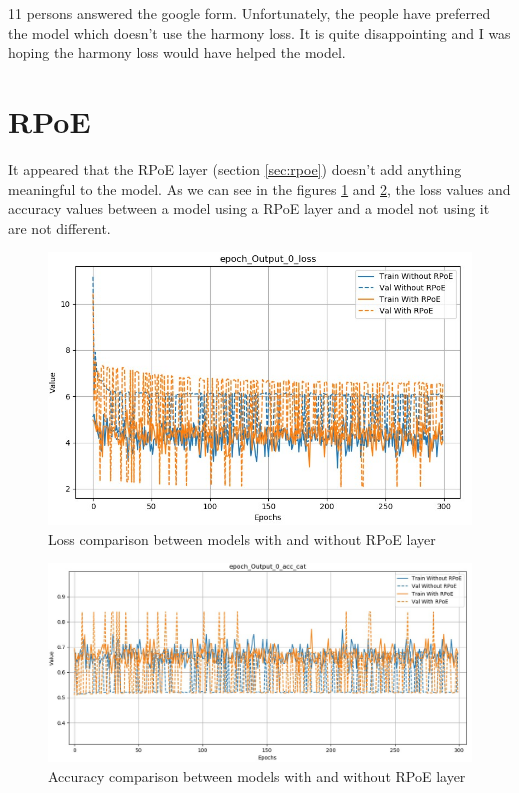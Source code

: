 \documentclass[12pt]{report}
\begin{document}
11 persons answered the google form.
Unfortunately, the people have preferred the model which doesn't use the harmony loss.
It is quite disappointing and I was hoping the harmony loss would have helped the model.


\section{RPoE}

It appeared that the RPoE layer (section \ref{sec:rpoe}) doesn't add anything meaningful to the model.
As we can see in the figures \ref{fig:loss-comparison-rpoe} and \ref{fig:acc-comparison-rpoe}, the loss values and accuracy values between a model using a RPoE layer and a model not using it are not different.

\begin{figure}[ht]
    \centering
    \includegraphics[width=\textwidth]{images/experiences/rpoe/loss-comparison-rpoe.jpg}
    \caption{Loss comparison between models with and without RPoE layer}
    \label{fig:loss-comparison-rpoe}
\end{figure}

\begin{figure}[ht]
    \centering
    \includegraphics[width=\textwidth]{images/experiences/rpoe/acc-comparison-rpoe.jpg}
    \caption{Accuracy comparison between models with and without RPoE layer}
    \label{fig:acc-comparison-rpoe}
\end{figure}
\end{document}
